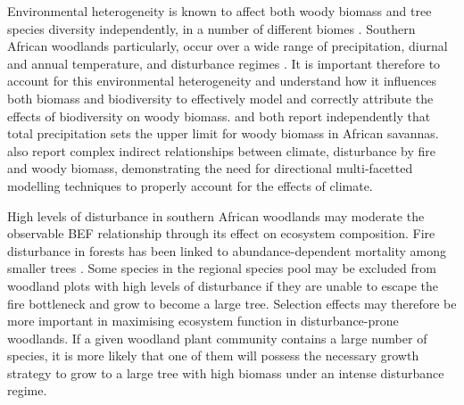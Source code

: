 \documentclass[11pt,a4paper]{article}
\begin{document}
Environmental heterogeneity is known to affect both woody biomass and tree species diversity independently, in a number of different biomes \citep{Spasojevic2014, Michaletz2018, Michaletz2014}. Southern African woodlands particularly, occur over a wide range of precipitation, diurnal and annual temperature, and disturbance regimes \citep{Frost1996}. It is important therefore to account for this environmental heterogeneity and understand how it influences both biomass and biodiversity to effectively model and correctly attribute the effects of biodiversity on woody biomass. \citet{Sankaran2005} and \citet{Lehmann2014} both report independently that total precipitation sets the upper limit for woody biomass in African savannas. \citet{Lehmann2014} also report complex indirect relationships between climate, disturbance by fire and woody biomass, demonstrating the need for directional multi-facetted modelling techniques to properly account for the effects of climate. 

High levels of disturbance in southern African woodlands may moderate the observable BEF relationship through its effect on ecosystem composition. Fire disturbance in forests has been linked to abundance-dependent mortality among smaller trees \citep{Roques2001, Staver2009, Bond2005}. Some species in the regional species pool may be excluded from woodland plots with high levels of disturbance if they are unable to escape the fire bottleneck and grow to become a large tree. Selection effects may therefore be more important in maximising ecosystem function in disturbance-prone woodlands. If a given woodland plant community contains a large number of species, it is more likely that one of them will possess the necessary growth strategy to grow to a large tree with high biomass under an intense disturbance regime. 
\end{document}
